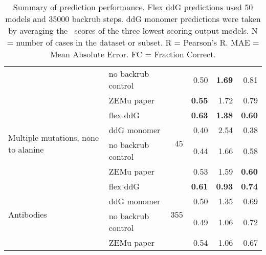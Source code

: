 \begin{table}
\begin{tabular}{llrrrr}
 & no backrub control & & 0.50 & \textbf{1.69} & 0.81  \\
 & ZEMu paper & & \textbf{0.55} & 1.72 & 0.79  \\
\hline
 \multirow{ 4}{*}{Multiple mutations, none to alanine} & flex ddG & \multirow{ 4}{*}{45} & \textbf{0.63} & \textbf{1.38} & \textbf{0.60}  \\
 & ddG monomer & & 0.40 & 2.54 & 0.38  \\
 & no backrub control & & 0.44 & 1.66 & 0.58  \\
 & ZEMu paper & & 0.53 & 1.59 & \textbf{0.60}  \\
\hline
 \multirow{ 4}{*}{Antibodies} & flex ddG & \multirow{ 4}{*}{355} & \textbf{0.61} & \textbf{0.93} & \textbf{0.74}  \\
 & ddG monomer & & 0.50 & 1.35 & 0.69  \\
 & no backrub control & & 0.49 & 1.06 & 0.72  \\
 & ZEMu paper & & 0.54 & 1.06 & 0.67  \\
\bottomrule
\end{tabular}
  \caption[]{
    Summary of prediction performance. Flex ddG predictions used 50 models and 35000 backrub steps. ddG monomer predictions were taken by averaging the \ddg\ scores of the three lowest scoring output models. N = number of cases in the dataset or subset. R = Pearson's R. MAE = Mean Absolute Error. FC = Fraction Correct.
  } \label{tab:table-main}
\end{table}
